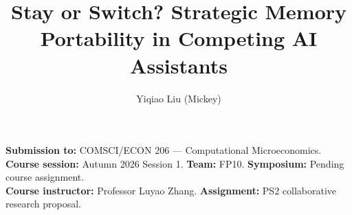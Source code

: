 \documentclass[sigconf,nonacm]{acmart}
\title{Stay or Switch? Strategic Memory Portability in Competing AI Assistants}
\author{Yiqiao Liu (Mickey)}
\affiliation{\institution{Duke Kunshan University}\city{Kunshan}\country{China}}
\newcommand{\CourseNumber}{COMSCI/ECON 206}
\newcommand{\CourseName}{Computational Microeconomics}
\newcommand{\CourseSession}{Autumn 2026 Session 1}
\newcommand{\Instructor}{Professor Luyao Zhang}
\newcommand{\TeamCode}{FP10}
\newcommand{\SymposiumSession}{Pending course assignment}
\newcommand{\coursemeta}{\noindent\textbf{Submission to:} \CourseNumber{} --- \CourseName.\\
\textbf{Course session:} \CourseSession. \textbf{Team:} \TeamCode. \textbf{Symposium:} \SymposiumSession.\\
\textbf{Course instructor:} \Instructor. \textbf{Assignment:} PS2 collaborative research proposal.\par\smallskip}
\begin{document}
\begin{teaserfigure}
\captionsetup{skip=8pt}
\centering

\caption{Evidence chain for strategic memory portability. The platform game, computation, welfare/incentive comparisons, and allocation analogy are completed at snapshot \texttt{f9523b0}. The public Stay/Switch artifact structures a separate user test; behavioral inference and the A0 poster remain planned.}
\label{fig:teaser}
\end{teaserfigure}
\maketitle\raggedbottom\coursemeta



\end{document}

